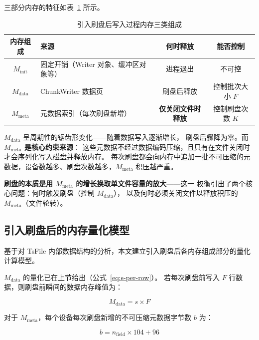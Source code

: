 三部分内存的特征如表~\ref{tab:mem-components} 所示。

\begin{table}[htbp]
  \centering
  \caption{引入刷盘后写入过程内存三类组成}
  \label{tab:mem-components}
  \begin{tabularx}{\textwidth}{c X c c}
    \toprule
    内存组成 & 来源 & 何时释放 & 能否控制 \\
    \midrule
    $M_{\text{init}}$ & 固定开销（Writer 对象、缓冲区对象等） & 进程退出 & 不可控 \\
    $M_{\text{data}}$ & ChunkWriter 数据页 & 刷盘后释放 & 控制批次大小 $F$ \\
    $M_{\text{meta}}$ & 元数据索引（每次刷盘新增） & \textbf{仅关闭文件时释放} & 控制刷盘次数 $K$ \\
    \bottomrule
  \end{tabularx}
\end{table}

$M_{\text{data}}$ 呈周期性的锯齿形变化——随着数据写入逐渐增长，
刷盘后骤降为零。而 \textbf{$M_{\text{meta}}$ 是核心约束来源}：
这些元数据不经过数据编码压缩，且只有在文件关闭时才会序列化写入磁盘并释放内存。
每次刷盘都会向内存中追加一批不可压缩的元数据，设备数越多、刷盘次数越多，$M_{\text{meta}}$ 积压越严重。

\textbf{刷盘的本质是用 $M_{\text{meta}}$ 的增长换取单文件容量的放大}——这一 
权衡引出了两个核心问题：何时触发刷盘（控制 $M_{\text{data}}$），
以及何时必须关闭文件以释放积压的 $M_{\text{meta}}$（文件轮转）。

\subsection{引入刷盘后的内存量化模型}
\label{subsec:flush-mem-model}

基于对 TsFile 内部数据结构的分析，本文建立引入刷盘后各内存组成部分的量化计算模型。

$M_{\text{data}}$ 的量化已在上节给出（公式~\eqref{eq:s-per-row}）。
若每次刷盘前写入 $F$ 行数据，则刷盘前瞬间的数据内存峰值为：

\begin{equation}
  M_{\text{data}} = s \times F
  \label{eq:m-data}
\end{equation}

对于 $M_{\text{meta}}$，每个设备每次刷盘新增的不可压缩元数据字节数 $b$ 为：

\begin{equation}
  b = n_{\text{field}} \times 104 + 96
  \label{eq:b-per-device}
\end{equation}


